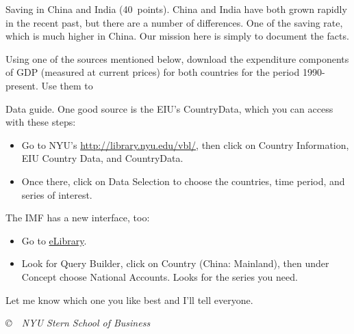 \documentclass[12pt]{exam}
\begin{document}
\begin{questions}

\question Saving in China and India (40~points).  
China and India have both grown rapidly in the recent past, 
but there are a number of differences.  
One of the saving rate, which is much higher in China.  
Our mission here is simply to document the facts.  

Using one of the sources mentioned below, 
download the expenditure components of GDP (measured at current prices)
for both countries for the period 1990-present.  Use them to
%


Data guide.  One good source is the EIU's CountryData, 
which you can access with these steps:  
\begin{itemize}
\item Go to NYU's  
\href{http://library.nyu.edu/vbl/}{http://library.nyu.edu/vbl/}, 
then click on 
Country Information, 
EIU Country Data, and   
CountryData.  
\item Once there, click on Data Selection to choose the countries,
time period, and series of interest.
\end{itemize}
The IMF has a new interface, too:   
\begin{itemize}
\item Go to 
\href{http://elibrary-data.imf.org/}{eLibrary}.
\item Look for Query Builder, 
click on Country (China: Mainland), 
then under Concept choose National Accounts.
Looks for the series you need.  
\end{itemize}  
Let me know which one you like best and I'll tell everyone.  
\end{questions}

\vfill \centerline{\it \copyright \ \number\year \
NYU Stern School of Business}
\end{document}
